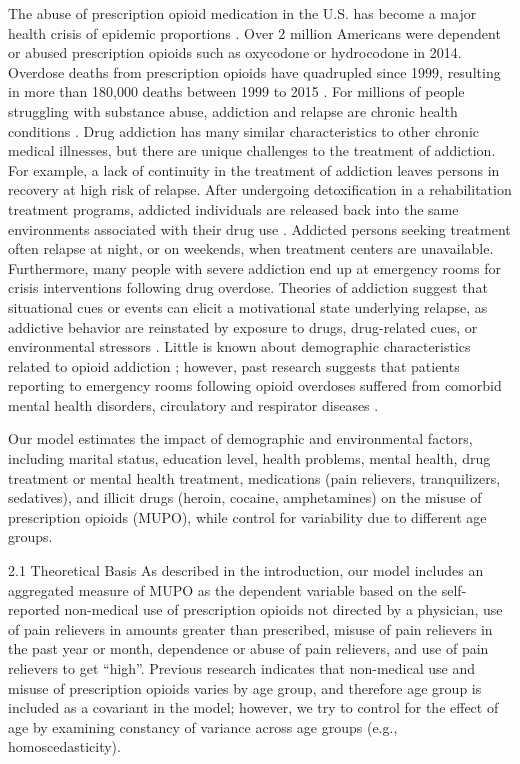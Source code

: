 \documentclass[sigconf]{acmart}
\begin{document}
The abuse of prescription opioid medication in the U.S. has become a major 
health crisis of epidemic proportions \cite{volkow14}. Over 2 million Americans 
were dependent or abused prescription opioids such as oxycodone or hydrocodone 
in 2014\cite{cdc17}. Overdose deaths from prescription opioids have quadrupled 
since 1999, resulting in more than 180,000 deaths between 1999 to 2015 
\cite{nida17, cdc16}. For millions of people struggling with substance abuse, 
addiction and relapse are chronic health conditions \cite{boyer10}. Drug 
addiction has many similar characteristics to other chronic medical illnesses,
but there are unique challenges to the treatment of addiction. For example, 
a lack of continuity in the treatment of addiction leaves persons in recovery 
at high risk of relapse. After undergoing detoxification in a rehabilitation 
treatment programs, addicted individuals are released back into the same 
environments associated with their drug use \cite{johnson11}. Addicted persons 
seeking treatment often relapse at night, or on weekends, when treatment 
centers are unavailable. Furthermore, many people with severe addiction end up 
at emergency rooms for crisis interventions following drug overdose. Theories 
of addiction suggest that situational cues or events can elicit a motivational 
state underlying relapse, as addictive behavior are reinstated by exposure 
to drugs, drug-related cues, or environmental stressors \cite{shaham03}. 
Little is known about demographic characteristics related to opioid addiction 
\cite{zedler14}; however, past research suggests that patients reporting to 
emergency rooms following opioid overdoses suffered from comorbid mental health 
disorders, circulatory and respirator diseases \cite{yokell13}. 





Our model estimates the impact of demographic and environmental factors, including marital status, education level, health problems, mental health, drug treatment or mental health treatment, medications (pain relievers, tranquilizers, sedatives), and illicit drugs (heroin, cocaine, amphetamines) on the misuse of prescription opioids (MUPO), while control for variability due to different age groups.  

2.1 Theoretical Basis
As described in the introduction, our model includes an aggregated measure of MUPO as the dependent variable based on the self-reported non-medical use of prescription opioids not directed by a physician, use of pain relievers in amounts greater than prescribed, misuse of pain relievers in the past year or month, dependence or abuse of pain relievers, and use of pain relievers to get “high”. Previous research indicates that non-medical use and misuse of prescription opioids varies by age group, and therefore age group is included as a covariant in the model; however, we try to control for the effect of age by examining constancy of variance across age groups (e.g., homoscedasticity).  
\end{document}
